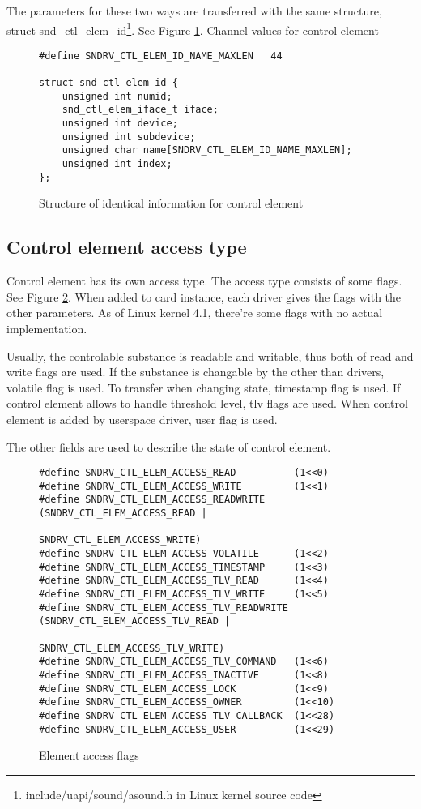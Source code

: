 \documentclass[onecolumn]{article}
\begin{document}
The parameters for these two ways are transferred with the same structure, struct snd\_ctl\_elem\_id\footnote{include/uapi/sound/asound.h in Linux kernel source code}. See Figure \ref{fig:control-element-id}.
Channel values for control element
\begin{figure}[htbp]
\small
\begin{verbatim}
#define SNDRV_CTL_ELEM_ID_NAME_MAXLEN	44

struct snd_ctl_elem_id {
    unsigned int numid;
    snd_ctl_elem_iface_t iface;
    unsigned int device;
    unsigned int subdevice;
    unsigned char name[SNDRV_CTL_ELEM_ID_NAME_MAXLEN];
    unsigned int index;
};
\end{verbatim}
\caption{{Structure of identical information for control element}}
\label{fig:control-element-id}
\end{figure}


\subsection{Control element access type}

Control element has its own access type. The access type consists of some flags. See Figure \ref{fig:element-access-flags}. When added to card instance, each driver gives the flags with the other parameters. As of Linux kernel 4.1, there're some flags with no actual implementation.

Usually, the controlable substance is readable and writable, thus both of read and write flags are used. If the substance is changable by the other than drivers, volatile flag is used. To transfer when changing state, timestamp flag is used. If control element allows to handle threshold level, tlv flags are used. When control element is added by userspace driver, user flag is used.

The other fields are used to describe the state of control element.

\begin{figure}[htbp]
\small
\begin{verbatim}
#define SNDRV_CTL_ELEM_ACCESS_READ          (1<<0)
#define SNDRV_CTL_ELEM_ACCESS_WRITE         (1<<1)
#define SNDRV_CTL_ELEM_ACCESS_READWRITE     (SNDRV_CTL_ELEM_ACCESS_READ |
                                             SNDRV_CTL_ELEM_ACCESS_WRITE)
#define SNDRV_CTL_ELEM_ACCESS_VOLATILE      (1<<2)
#define SNDRV_CTL_ELEM_ACCESS_TIMESTAMP     (1<<3)
#define SNDRV_CTL_ELEM_ACCESS_TLV_READ      (1<<4)
#define SNDRV_CTL_ELEM_ACCESS_TLV_WRITE     (1<<5)
#define SNDRV_CTL_ELEM_ACCESS_TLV_READWRITE (SNDRV_CTL_ELEM_ACCESS_TLV_READ |
                                             SNDRV_CTL_ELEM_ACCESS_TLV_WRITE)
#define SNDRV_CTL_ELEM_ACCESS_TLV_COMMAND   (1<<6)
#define SNDRV_CTL_ELEM_ACCESS_INACTIVE      (1<<8)
#define SNDRV_CTL_ELEM_ACCESS_LOCK          (1<<9)
#define SNDRV_CTL_ELEM_ACCESS_OWNER         (1<<10)
#define SNDRV_CTL_ELEM_ACCESS_TLV_CALLBACK  (1<<28)
#define SNDRV_CTL_ELEM_ACCESS_USER          (1<<29)
\end{verbatim}
\caption{{Element access flags}}
\label{fig:element-access-flags}
\end{figure}
\end{document}
